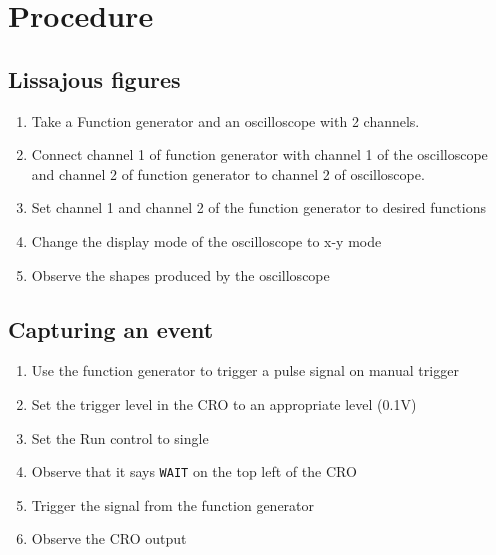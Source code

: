 \documentclass[journal]{IEEEtran}
\begin{document}


\section{Procedure}
\subsection{Lissajous figures}
\begin{enumerate}
    \item Take a Function generator and an oscilloscope with 2 channels.
    \item Connect channel 1 of function generator with channel 1 of the oscilloscope and channel 2 of function generator to channel 2 of oscilloscope.
    \item Set channel 1 and channel 2 of the function generator to desired functions
    \item Change the display mode of the oscilloscope to x-y mode
    \item Observe the shapes produced by the oscilloscope
\end{enumerate}

\subsection{Capturing an event}
\begin{enumerate}
    \item Use the function generator to trigger a pulse signal on manual trigger
    \item Set the trigger level in the CRO to an appropriate level (0.1V)
    \item Set the Run control to single
    \item Observe that it says \texttt{WAIT} on the top left of the CRO
    \item Trigger the signal from the function generator
    \item Observe the CRO output
\end{enumerate}
\end{document}
